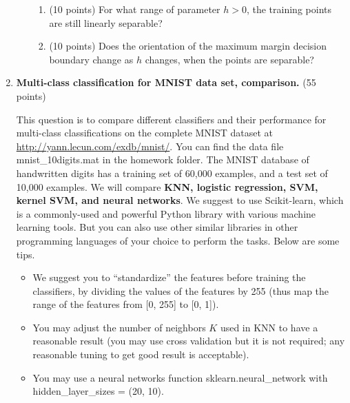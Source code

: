 \documentclass[twoside,10pt]{article}
\begin{document}
\begin{enumerate}
\begin{enumerate}
\begin{enumerate}
\item (10 points) For what range of parameter $h > 0$, the training points are still linearly separable?



\item (10 points) Does the orientation of the maximum margin decision boundary change as $h$ changes, when the points are separable?
\end{enumerate}
\end{enumerate}



\item {\bf Multi-class classification for MNIST data set, comparison.} (55 points)

This question is to compare different classifiers and their performance for multi-class classifications on the complete MNIST dataset at \url{http://yann.lecun.com/exdb/mnist/}. You can find the data file \textsf{mnist\_10digits.mat} in the homework folder. The MNIST database of handwritten digits has a training set of 60,000 examples, and a test set of 10,000 examples. We will compare {\bf KNN, logistic regression, SVM, kernel SVM, and  neural networks}. We suggest to use \textsf{Scikit-learn}, which is a commonly-used and powerful \textsf{Python} library with various machine learning tools. But you can also use other similar libraries in other programming languages of your choice to perform the tasks. Below are some tips. 

\begin{itemize}

\item We suggest you to ``standardize'' the features before training the classifiers, by dividing the values of the features by 255 (thus map the range of the features from [0, 255] to [0, 1]).

\item You may adjust the number of neighbors $K$ used in KNN to have a reasonable result (you may use cross validation but it is not required; any reasonable tuning to get good result is acceptable).

\item You may use a neural networks function \textsf{sklearn.neural\_network} with \textsf{hidden\_layer\_sizes = (20, 10)}. 



\end{itemize}
\end{enumerate}
\end{document}
